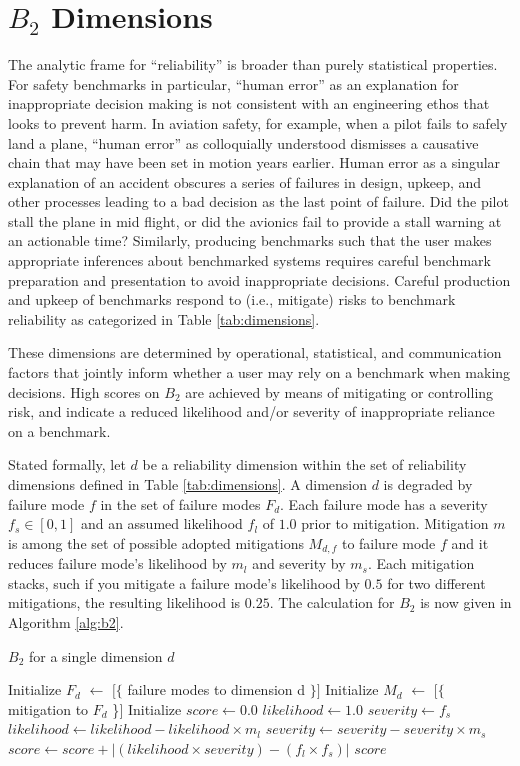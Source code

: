 \documentclass{article}
\newcommand\bb{$B_2$ }
\begin{document}
\section{\texorpdfstring{\bb}{B2} Dimensions}
The analytic frame for ``reliability'' is broader than purely statistical properties. For safety benchmarks in particular, ``human error'' as an explanation for inappropriate decision making is not consistent with an engineering ethos that looks to prevent harm. In aviation safety, for example, when a pilot fails to safely land a plane, ``human error'' as colloquially understood dismisses a causative chain that may have been set in motion years earlier. Human error as a singular explanation of an accident obscures a series of failures in design, upkeep, and other processes leading to a bad decision as the last point of failure. Did the pilot stall the plane in mid flight, or did the avionics fail to provide a stall warning at an actionable time? Similarly, producing benchmarks such that the user makes appropriate inferences about benchmarked systems requires careful benchmark preparation and presentation to avoid inappropriate decisions. Careful production and upkeep of benchmarks respond to (i.e., mitigate) risks to benchmark reliability as categorized in Table \ref{tab:dimensions}.

These dimensions are determined by operational, statistical, and communication factors that jointly inform whether a user may rely on a benchmark when making decisions. High scores on \bb are achieved by means of mitigating or controlling risk, and indicate a reduced likelihood and/or severity of inappropriate reliance on a benchmark.

Stated formally, let $d$ be a reliability dimension within the set of reliability dimensions defined in Table \ref{tab:dimensions}. A dimension $d$ is degraded by failure mode $f$ in the set of failure modes  $F_d$. Each failure mode has a severity $f_s\in{[0,1]}$ and an assumed likelihood $f_l$ of $1.0$ prior to mitigation. Mitigation $m$ is among the set of possible adopted mitigations $M_{d,f}$ to failure mode $f$ and it reduces failure mode's likelihood by $m_l$ and severity by $m_s$. Each mitigation stacks, such if you mitigate a failure mode's likelihood by $0.5$ for two different mitigations, the resulting likelihood is $0.25$. The calculation for \bb is now given in Algorithm \ref{alg:b2}.

\begin{algorithm}
\caption{\bb for a single dimension $d$}
\label{alg:b2}
\begin{algorithmic}[1]
\State Initialize $F_d$ $\gets$ $[ \{$ failure modes to dimension d $\} ]$
\State Initialize $M_d$ $\gets$ $[ \{$ mitigation to $F_d$ \}$ ]$
\State Initialize $score \gets 0.0$
    \State $likelihood \gets 1.0$
    \State $severity \gets f_s$
        \State $likelihood \gets likelihood - likelihood \times m_l$
        \State $severity \gets severity - severity \times m_s$
    \EndFor
    \State $score \gets score + |(likelihood\times severity) - (f_l\times f_s)|$
\EndFor
\State \Return $score$
\end{algorithmic}
\end{algorithm}
\end{document}
